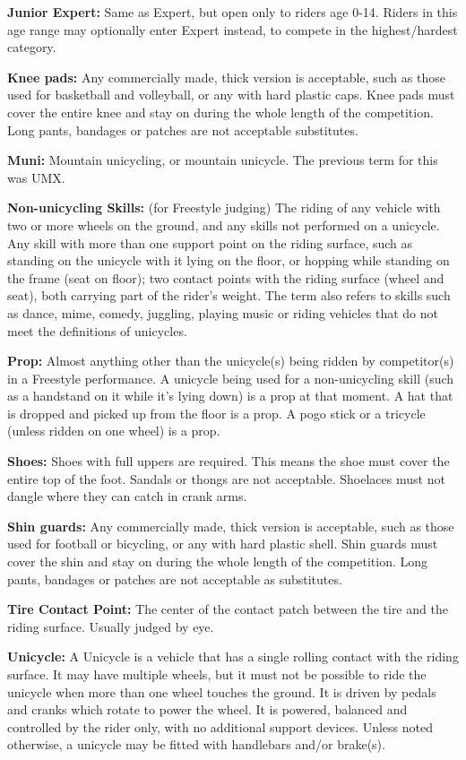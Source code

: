 \textbf{Junior Expert:} Same as Expert, but open only to riders age 0-14.
Riders in this age range may optionally enter Expert instead, to compete in the highest/hardest category.

\textbf{Knee pads:} Any commercially made, thick version is acceptable, such as those used for basketball and volleyball, or any with hard plastic caps.
Knee pads must cover the entire knee and stay on during the whole length of the competition.
Long pants, bandages or patches are not acceptable substitutes.

\textbf{Muni:} Mountain unicycling, or mountain unicycle.
The previous term for this was UMX.

\textbf{Non-unicycling Skills:} (for Freestyle judging) The riding of any vehicle with two or more wheels on the ground, and any skills not performed on a unicycle.
Any skill with more than one support point on the riding surface, such as standing on the unicycle with it lying on the floor, or hopping while standing on the frame (seat on floor); two contact points with the riding surface (wheel and seat), both carrying part of the rider's weight.
The term also refers to skills such as dance, mime, comedy, juggling, playing music or riding vehicles that do not meet the definitions of unicycles.

\textbf{Prop:} Almost anything other than the unicycle(s) being ridden by competitor(s) in a Freestyle performance.
A unicycle being used for a non-unicycling skill (such as a handstand on it while it's lying down) is a prop at that moment.
A hat that is dropped and picked up from the floor is a prop.
A pogo stick or a tricycle (unless ridden on one wheel) is a prop.

\textbf{Shoes:} Shoes with full uppers are required.
This means the shoe must cover the entire top of the foot.
Sandals or thongs are not acceptable.
Shoelaces must not dangle where they can catch in crank arms.

\textbf{Shin guards:} Any commercially made, thick version is acceptable, such as those used for football or bicycling, or any with hard plastic shell.
Shin guards must cover the shin and stay on during the whole length of the competition.
Long pants, bandages or patches are not acceptable as substitutes.

\textbf{Tire Contact Point:} The center of the contact patch between the tire and the riding surface.
Usually judged by eye.

\textbf{Unicycle:} A Unicycle is a vehicle that has a single rolling contact with the riding surface.
It may have multiple wheels, but it must not be possible to ride the unicycle when more than one wheel touches the ground.
It is driven by pedals and cranks which rotate to power the wheel.
It is powered, balanced and controlled by the rider only, with no additional support devices.
Unless noted otherwise, a unicycle may be fitted with handlebars and/or brake(s).

